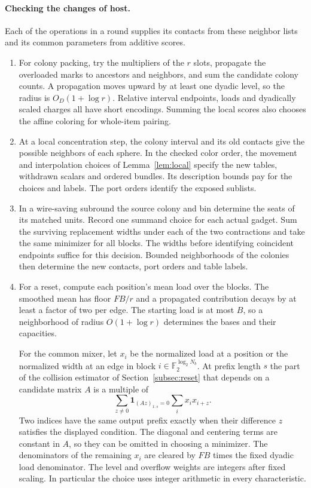 \paragraph{Checking the changes of host.}
Each of the operations in a round supplies its contacts from these
neighbor lists and its common parameters from additive scores.
\begin{enumerate}
\item For colony packing, try the multipliers of the $r$ slots,
propagate the overloaded marks to ancestors and neighbors, and sum
the candidate colony counts. A propagation moves upward by at least
one dyadic level, so the radius is $O_D(1+\log r)$. Relative
interval endpoints, loads and dyadically scaled charges all have
short encodings. Summing the local scores also chooses the affine
coloring for whole-item pairing.
\item At a local concentration step, the colony interval and its
old contacts give the possible neighbors of each sphere. In the
checked color order, the movement and interpolation choices of
Lemma~\ref{lem:local} specify the new tables, withdrawn scalars
and ordered bundles. Its description bounds pay for the choices and
labels. The port orders identify the exposed sublists.
\item In a wire-saving subround the source colony and bin determine
the seats of its matched units. Record one summand choice for each
actual gadget. Sum the surviving replacement widths under each of
the two contractions and take the same minimizer for all blocks.
The widths before identifying coincident endpoints suffice for this
decision. Bounded neighborhoods of the colonies then determine the
new contacts, port orders and table labels.
\item For a reset, compute each position's mean load over the blocks.
The smoothed mean has floor $FB/r$ and a propagated contribution
decays by at least a factor of two per edge. The starting load is at
most $B$, so a neighborhood of radius $O(1+\log r)$ determines the
bases and their capacities.

For the common mixer, let $x_i$ be the normalized load at a position
or the normalized width at an edge in block
$i\in\mathbb F_2^{\log_2 N_b}$. At prefix length $s$ the part of
the collision estimator of Section~\ref{subsec:reset} that depends
on a candidate matrix $A$ is a multiple of
\[
 \sum_{z\ne0}\boldsymbol{1}_{(Az)_{1:s}=0}
                     \sum_i x_i x_{i+z}.
\]
Two indices have the same output prefix exactly when their
difference $z$ satisfies the displayed condition. The diagonal and
centering terms are constant in $A$, so they can be omitted in
choosing a minimizer. The denominators of the remaining $x_i$ are
cleared by $FB$ times the fixed dyadic load denominator. The level
and overflow weights are integers after fixed scaling. In
particular the choice uses integer arithmetic in every
characteristic.


\end{enumerate}
